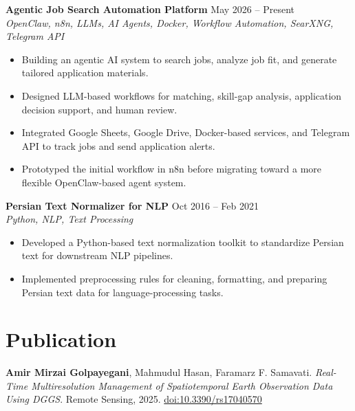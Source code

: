 \documentclass[a4paper,10pt]{article}
\newcommand{\resumeSubheading}[4]{
    \textbf{#1} \hfill #2 \\
    \textit{#3} \hfill \textit{#4}
}
\begin{document}
\noindent
\textbf{Agentic Job Search Automation Platform} \hfill May 2026 -- Present \\
\textit{OpenClaw, n8n, LLMs, AI Agents, Docker, Workflow Automation, SearXNG, Telegram API}
\begin{itemize}[leftmargin=0.25in]
    \item Building an agentic AI system to search jobs, analyze job fit, and generate tailored application materials.
    \item Designed LLM-based workflows for matching, skill-gap analysis, application decision support, and human review.
    \item Integrated Google Sheets, Google Drive, Docker-based services, and Telegram API to track jobs and send application alerts.
    \item Prototyped the initial workflow in n8n before migrating toward a more flexible OpenClaw-based agent system.
\end{itemize}

\noindent
\textbf{Persian Text Normalizer for NLP} \hfill Oct 2016 -- Feb 2021 \\
\textit{Python, NLP, Text Processing}
\begin{itemize}[leftmargin=0.25in]
    \item Developed a Python-based text normalization toolkit to standardize Persian text for downstream NLP pipelines.
    \item Implemented preprocessing rules for cleaning, formatting, and preparing Persian text data for language-processing tasks.
\end{itemize}

\section*{Publication}

\textbf{Amir Mirzai Golpayegani}, Mahmudul Hasan, Faramarz F. Samavati.
\textit{Real-Time Multiresolution Management of Spatiotemporal Earth Observation Data Using DGGS}.
Remote Sensing, 2025. \href{https://doi.org/10.3390/rs17040570}{doi:10.3390/rs17040570}



\end{document}
